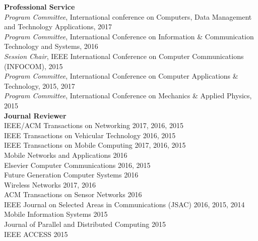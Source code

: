 \documentclass[margin,line]{res}
\begin{document}
\begin{resume}
\vspace{-0.15in}
{\bf Professional Service}\\
{\em Program Committee}, International conference on Computers, Data Management and Technology Applications, 2017\\
{\em Program Committee}, International Conference on Information \& Communication Technology and Systems, 2016\\
{\em Session Chair}, IEEE International Conference on Computer Communications (INFOCOM), 2015\\
{\em Program Committee}, International Conference on Computer Applications \& Technology, 2015, 2017\\
{\em Program Committee},  International Conference on Mechanics \& Applied Physics, 2015\\

\vspace{-0.15in}
{\bf Journal Reviewer}\\
IEEE/ACM Transactions on Networking 2017, 2016, 2015 \\
IEEE Transactions on Vehicular Technology 2016, 2015\\
IEEE Transactions on Mobile Computing 2017, 2016, 2015 \\
Mobile Networks and Applications 2016 \\
Elsevier Computer Communications 2016, 2015\\
Future Generation Computer Systems 2016 \\
Wireless Networks 2017, 2016\\
ACM Transactions on Sensor Networks 2016 \\
IEEE Journal on Selected Areas in Communications (JSAC) 2016, 2015, 2014\\
Mobile Information Systems 2015 \\
Journal of Parallel and Distributed Computing 2015 \\
IEEE ACCESS 2015


\end{resume}
\end{document}
